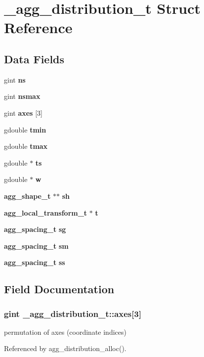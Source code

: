 \section{\+\_\+agg\+\_\+distribution\+\_\+t Struct Reference}
\label{struct__agg__distribution__t}
\subsection*{Data Fields}
\begin{DoxyCompactItemize}
\item 
gint {\bf ns}
\item 
gint {\bf nsmax}
\item 
gint {\bf axes} [3]
\item 
gdouble {\bf tmin}
\item 
gdouble {\bf tmax}
\item 
gdouble $\ast$ {\bf ts}
\item 
gdouble $\ast$ {\bf w}
\item 
{\bf agg\+\_\+shape\+\_\+t} $\ast$$\ast$ {\bf sh}
\item 
{\bf agg\+\_\+local\+\_\+transform\+\_\+t} $\ast$ {\bf t}
\item 
{\bf agg\+\_\+spacing\+\_\+t} {\bf sg}
\item 
{\bf agg\+\_\+spacing\+\_\+t} {\bf sm}
\item 
{\bf agg\+\_\+spacing\+\_\+t} {\bf ss}
\end{DoxyCompactItemize}


\subsection{Field Documentation}
\subsubsection[{axes}]{\setlength{\rightskip}{0pt plus 5cm}gint \+\_\+agg\+\_\+distribution\+\_\+t\+::axes[3]}\label{struct__agg__distribution__t_acb3b2eff76203e91eb89d4fedd873020}
permutation of axes (coordinate indices) 

Referenced by agg\+\_\+distribution\+\_\+alloc().

